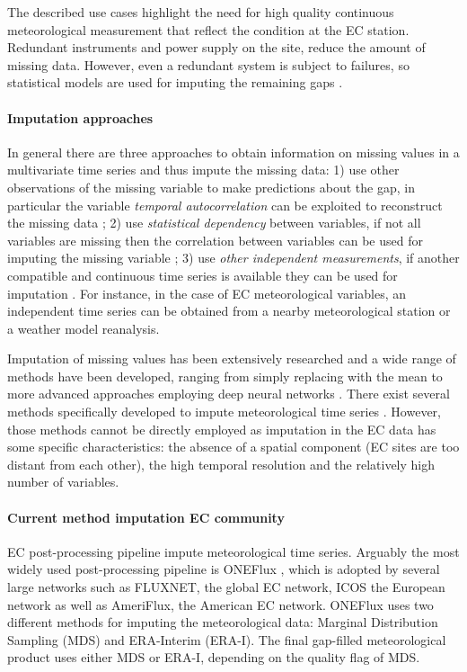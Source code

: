 \documentclass{article}
\begin{document}
The described use cases highlight the need for high quality continuous meteorological measurement that reflect the condition at the EC station. Redundant instruments and power supply on the site, reduce the amount of missing data. However, even a redundant system is subject to failures, so statistical models are used for imputing the remaining gaps \cite{aubinet_eddy_2012-1}.

\paragraph{Imputation approaches} In general there are three approaches to obtain information on missing values in a multivariate time series and thus impute the missing data: 1) use other observations of the missing variable to make predictions about the gap, in particular the variable \emph{temporal autocorrelation} can be exploited to reconstruct the missing data \cite{moritz_comparison_nodate}; 2) use \emph{statistical dependency} between variables, if not all variables are missing then the correlation between variables can be used for imputing the missing variable \cite{moffat_comprehensive_2007}; 3) use \emph{other independent measurements}, if another compatible and continuous time series is available they can be used for imputation \cite{vuichard_filling_2015}. For instance, in the case of EC meteorological variables, an independent time series can be obtained from a nearby meteorological station or a weather model reanalysis. 

Imputation of missing values has been extensively researched and a wide range of methods have been developed, ranging from simply replacing with the mean to more advanced approaches employing deep neural networks \cite{moritz_r_2017, fang_time_2020-1, buuren_mice_2011, du_saits_2022-1, zhang_dual-head_2021-2, cao_brits_nodate}. There exist several methods specifically developed to impute meteorological time series \cite{costa_gap_2021, jing_multi-imputation_2022}. However, those methods cannot be directly employed as imputation in the EC data has some specific characteristics: the absence of a spatial component (EC sites are too distant from each other), the high temporal resolution and the relatively high number of variables. 

\paragraph{Current method imputation EC community} EC post-processing pipeline impute meteorological time series. Arguably the most widely used post-processing pipeline is \textsf{ONEFlux} \cite{pastorello_fluxnet2015_2020}, which is adopted by several large networks such as FLUXNET, the global EC network, ICOS the European network as well as AmeriFlux, the American EC network.
ONEFlux uses two different methods for imputing the meteorological data: Marginal Distribution Sampling (MDS) and ERA-Interim (ERA-I). The final gap-filled meteorological product uses either MDS or ERA-I, depending on the quality flag of MDS.
\end{document}
